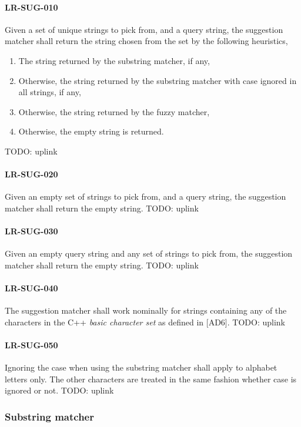 \paragraph{LR-SUG-010}
Given a set of unique strings to pick from, and a query string,
the suggestion matcher shall return the string chosen from the set
by the following heuristics,
\begin{enumerate}
\item The string returned by the substring matcher, if any,
\item Otherwise, the string returned by the substring matcher
      with case ignored in all strings, if any,
\item Otherwise, the string returned by the fuzzy matcher,
\item Otherwise, the empty string is returned.
\end{enumerate}
TODO: uplink

\paragraph{LR-SUG-020}
Given an empty set of strings to pick from, and a query string,
the suggestion matcher shall return the empty string.
TODO: uplink

\paragraph{LR-SUG-030}
Given an empty query string and any set of strings to pick from,
the suggestion matcher shall return the empty string.
TODO: uplink

\paragraph{LR-SUG-040}
The suggestion matcher shall work nominally for strings containing
any of the characters in the C++ \emph{basic character set} as
defined in [AD6].
TODO: uplink

\paragraph{LR-SUG-050}
Ignoring the case when using the substring matcher shall apply
to alphabet letters only. The other characters are treated
in the same fashion whether case is ignored or not.
TODO: uplink

\subsubsection{Substring matcher}
